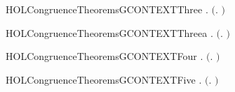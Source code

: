 \begin{SaveVerbatim}{HOLCongruenceTheoremsGCONTEXTThree}
\HOLTokenTurnstile{} \HOLSymConst{\HOLTokenForall{}} .   \HOLSymConst{\HOLTokenImp{}}  \ensuremath{(}\HOLTokenLambda{}. \HOLSymConst{\ensuremath{\ldotp}} \ensuremath{)}
\end{SaveVerbatim}
\newcommand{\HOLCongruenceTheoremsGCONTEXTThree}{\UseVerbatim{HOLCongruenceTheoremsGCONTEXTThree}}
\begin{SaveVerbatim}{HOLCongruenceTheoremsGCONTEXTThreea}
\HOLTokenTurnstile{} \HOLSymConst{\HOLTokenForall{}}.  \ensuremath{(}\HOLTokenLambda{}. \HOLSymConst{\ensuremath{\ldotp}}\ensuremath{)}
\end{SaveVerbatim}
\newcommand{\HOLCongruenceTheoremsGCONTEXTThreea}{\UseVerbatim{HOLCongruenceTheoremsGCONTEXTThreea}}
\begin{SaveVerbatim}{HOLCongruenceTheoremsGCONTEXTFour}
\HOLTokenTurnstile{} \HOLSymConst{\HOLTokenForall{}}   .
         \HOLSymConst{\HOLTokenConj{}}   \HOLSymConst{\HOLTokenImp{}}
        \ensuremath{(}\HOLTokenLambda{}. \HOLSymConst{\ensuremath{\ldotp}}  \HOLSymConst{\ensuremath{+}} \HOLSymConst{\ensuremath{\ldotp}} \ensuremath{)}
\end{SaveVerbatim}
\newcommand{\HOLCongruenceTheoremsGCONTEXTFour}{\UseVerbatim{HOLCongruenceTheoremsGCONTEXTFour}}
\begin{SaveVerbatim}{HOLCongruenceTheoremsGCONTEXTFive}
\HOLTokenTurnstile{} \HOLSymConst{\HOLTokenForall{}} .
         \HOLSymConst{\HOLTokenConj{}}   \HOLSymConst{\HOLTokenImp{}}  \ensuremath{(}\HOLTokenLambda{}.   \HOLSymConst{\ensuremath{\mid}}  \ensuremath{)}
\end{SaveVerbatim}
